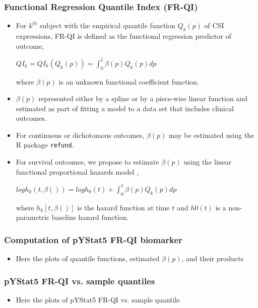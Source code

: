 \documentclass[t,10pt]{beamer}
\begin{document}
	\frame
	{\frametitle{Functional Regression Quantile Index (FR-QI)}
		\begin{itemize}		
		\item 
 For $k^{th}$ subject with the empirical quantile function $Q_{k}(p)$ of CSI expressions, FR-QI is defined as the functional regression predictor of outcome,
		 \begin{center}
		 	$QI_{k}=QI_{k}(Q_{k}(p))= \int_{0}^{1} \beta(p)Q_{k}(p)dp$
		\end{center}
		\linebreak
		where $\beta(p)$ is an unknown functional coefficient function.
\item $\beta(p)$ represented either by a spline \cite{Ramsay2006} or by a piece-wise linear function \cite{James09} and estimated as part of fitting a model to a data set that includes clinical outcomes. 
	\item For continuous or dichotomous outcomes, $\beta(p)$ may be estimated using the R package \texttt{refund}.
	\item For survival outcomes, we propose to estimate $\beta(p)$ using the linear functional proportional hazards model \cite{Gellar15}, \cite{Cui20}
              \begin{center}
		 	$log h_{k}(t, \beta())=log h_{0} (t)+ \int_{0}^{1} \beta(p)Q_{k}(p)dp$
	    \end{center}
where $h_{k}[t,\beta()]$ is the hazard function at time $t$ and $h0(t)$ is a non-parametric baseline hazard function.	    
		\end{itemize}
	}		
		
	
	\frame
	{\frametitle{Computation of pYStat5 FR-QI biomarker}
		\begin{itemize}	
			\item	Here the plots of quantile functions, estimated $\beta(p)$, and their products
		\end{itemize}
	}	
	
		\frame
	{\frametitle{pYStat5 FR-QI vs. sample quantiles}
		\begin{itemize}	
			\item	Here the plots of pYStat5 FR-QI vs. sample quantile
		\end{itemize}
	}	
\end{document}

